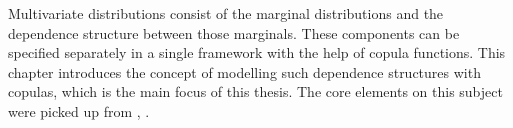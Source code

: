 
Multivariate distributions consist of the marginal distributions and the dependence structure between those marginals. These components can be specified separately in a single framework with the help of copula functions. This chapter introduces the concept of modelling such dependence structures with copulas, which is the main focus of this thesis. The core elements on this subject were picked up from \cite{mcneil2015quantitative}, \cite{Ruppert2015}.